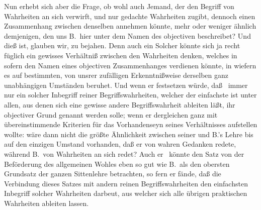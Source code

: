 Nun erhebt sich aber die Frage, ob wohl auch Jemand, der den Begriff von Wahrheiten an sich verwirft, und nur gedachte Wahrheiten zugibt, dennoch einen Zusammenhang zwischen denselben annehmen könnte, mehr oder weniger ähnlich demjenigen, den uns B.\ hier unter dem Namen des objectiven beschreibet? Und dieß ist, glauben wir, zu bejahen. Denn auch ein Solcher könnte sich ja recht füglich ein gewisses Verhältniß zwischen den Wahrheiten denken, welches in sofern den Namen eines objectiven Zusammenhanges verdienen könnte, in wiefern es auf bestimmten, von unsrer zufälligen Erkenntnißweise derselben ganz unabhängigen Umständen beruhet. Und wenn er festsetzen würde, daß \zB\ immer nur ein solcher Inbegriff reiner Begriffswahrheiten, welcher der einfachste ist unter allen, aus denen sich eine gewisse andere Begriffswahrheit ableiten läßt, ihr objectiver Grund genannt werden solle; wenn er dergleichen ganz mit  übereinstimmende Kriterien für das Vorhandenseyn seines Verhältnisses aufstellen wollte: wäre dann nicht die größte Ähnlichkeit zwischen seiner und B.'s Lehre bis auf den einzigen Umstand vorhanden, daß er von wahren Gedanken redete, während B.\ von Wahrheiten an sich redet? Auch er \zB\ könnte den Satz von der Beförderung des allgemeinen Wohles eben so gut wie B.\ als den obersten Grundsatz der ganzen Sittenlehre betrachten, so fern er fände, daß die Verbindung dieses Satzes mit andern reinen Begriffswahrheiten den einfachsten Inbegriff solcher Wahrheiten darbeut, aus welcher sich alle übrigen praktischen Wahrheiten ableiten lassen. \par
